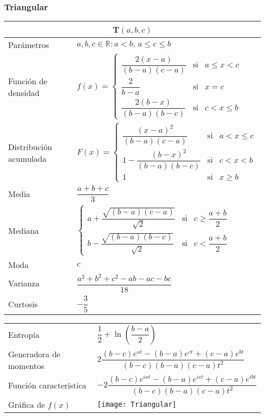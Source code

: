 \documentclass[12pt,a4paper]{article}
\begin{document}
\subsubsection*{Triangular}
\begin{center}
	\begin{tabular}{p{}|p{}}
	\multicolumn{2}{c}{T$(a,b,c)$} \\
	\hline
	Parámetros & $a,b,c\in\mathbb{R}\colon a < b,\, a\leq c\leq b$ \\
	Función de densidad & $f(x) = \left\{\begin{array}{lcc}
             \dfrac{2(x - a)}{(b - a)(c - a)} & \text{si} & a\leq x < c \\
             \dfrac{2}{b - a} & \text{si} & x = c \\
             \dfrac{2(b - x)}{(b - a)(b - c)} & \text{si} & c < x\leq b
             \end{array}\right.$ \\
	\vspace{1.7cm}Distribución acumulada & \vspace{1mm}$F(x) = \left\{\begin{array}{lcc}
             \dfrac{(x - a)^2}{(b - a)(c - a)} & \text{si} & a < x\leq c \\
             1 - \dfrac{(b - x)^2}{(b - a)(b - c)} & \text{si} & c < x < b \\
             1 & \text{si} & x\geq b
             \end{array}\right.$ \\
	\vspace{0.3cm}Media & \vspace{1mm}$\dfrac{a + b + c}{3}$ \\
	\vspace{1.1cm}Mediana & \vspace{1mm}$\left\{\begin{array}{lcc}
             a + \dfrac{\sqrt{(b - a)(c - a)}}{\sqrt{2}} & \text{si} & c\geq\dfrac{a + b}{2} \\
             b - \dfrac{\sqrt{(b - a)(b - c)}}{\sqrt{2}} & \text{si} & c < \dfrac{a + b}{2}
             \end{array}\right.$ \\
	Moda & $c$ \\
	Varianza & $\dfrac{a^2 + b^2 + c^2 - ab - ac - bc}{18}$ \\
	Curtosis & $-\dfrac{3}{5}$
	\end{tabular}
	\begin{tabular}{p{}|p{}}
	Entropía & $\dfrac{1}{2} + \ln\left(\dfrac{b - a}{2}\right)$ \\
	Generadora de momentos & $2\dfrac{(b - c)e^{at} - (b - a)e^{ct} + (c - a)e^{bt}}{(b - c)(b - a)(c - a)t^2}$ \\
	Función característica & $- 2\dfrac{(b - c)e^{iat} - (b - a)e^{ict} + (c - a)e^{ibt}}{(b - c)(b - a)(c - a)t^2}$ \\
	\vspace{0.25cm}Gráfica de $f(x)$ & \vspace{1mm}\texttt{[image: Triangular]}
	\end{tabular}
\end{center}
\end{document}
